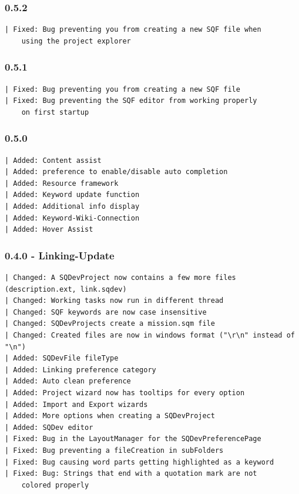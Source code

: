 \documentclass[twoside=false]{scrbook}
\begin{document}
	\subsubsection*{0.5.2}
	\begin{lstlisting}[breaklines=true]
| Fixed: Bug preventing you from creating a new SQF file when 
	using the project explorer
	\end{lstlisting}
	
	\subsubsection*{0.5.1}
	\begin{lstlisting}[breaklines=true]
| Fixed: Bug preventing you from creating a new SQF file
| Fixed: Bug preventing the SQF editor from working properly
	on first startup
	\end{lstlisting}
	
	\subsubsection*{0.5.0}
	\begin{lstlisting}[breaklines=true]
| Added: Content assist
| Added: preference to enable/disable auto completion
| Added: Resource framework
| Added: Keyword update function
| Added: Additional info display
| Added: Keyword-Wiki-Connection
| Added: Hover Assist
	\end{lstlisting}
	
	\subsubsection*{0.4.0 - Linking-Update}
	\begin{lstlisting}[breaklines=true]
| Changed: A SQDevProject now contains a few more files (description.ext, link.sqdev)
| Changed: Working tasks now run in different thread
| Changed: SQF keywords are now case insensitive
| Changed: SQDevProjects create a mission.sqm file
| Changed: Created files are now in windows format ("\r\n" instead of "\n")
| Added: SQDevFile fileType
| Added: Linking preference category
| Added: Auto clean preference
| Added: Project wizard now has tooltips for every option
| Added: Import and Export wizards
| Added: More options when creating a SQDevProject
| Added: SQDev editor
| Fixed: Bug in the LayoutManager for the SQDevPreferencePage
| Fixed: Bug preventing a fileCreation in subFolders
| Fixed: Bug causing word parts getting highlighted as a keyword
| Fixed: Bug: Strings that end with a quotation mark are not 
	colored properly
	\end{lstlisting}
	
\end{document}
